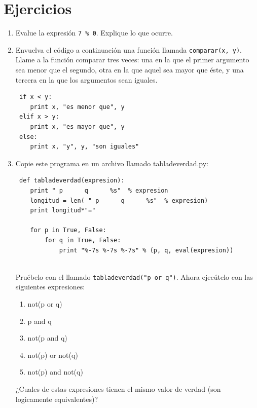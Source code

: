 \section{Ejercicios}
\begin{enumerate}

 \item Evalue la expresión \verb+7 % 0+. Explique lo que ocurre.
 
 \item Envuelva el código a continuación una función llamada \verb+comparar(x, y)+. Llame a la función comparar tres veces: 
 una en la que el primer argumento sea menor que el segundo, otra en la que aquel sea mayor que éste, y 
 una tercera en la que los argumentos sean iguales.
 \begin{verbatim} 
 if x < y:
    print x, "es menor que", y
 elif x > y:
    print x, "es mayor que", y
 else:
    print x, "y", y, "son iguales"
 \end{verbatim}
 
 \item Copie este programa en un archivo llamado tabladeverdad.py:
 \begin{verbatim}
 def tabladeverdad(expresion):
    print " p      q      %s"  % expresion
    longitud = len( " p      q      %s"  % expresion)
    print longitud*"="

    for p in True, False:
        for q in True, False:
            print "%-7s %-7s %-7s" % (p, q, eval(expresion))
 
 \end{verbatim}
 Pruébelo con el llamado \verb+tabladeverdad("p or q")+. Ahora ejecútelo con las siguientes expresiones:
 \begin{enumerate}
 \item not(p or q)
 \item p and q
 \item not(p and q)
 \item not(p) or not(q)
 \item not(p) and not(q)
 \end{enumerate}
 
 ¿Cuales de estas expresiones tienen el mismo valor de verdad (son logicamente equivalentes)?
 
 
 
\end{enumerate}

